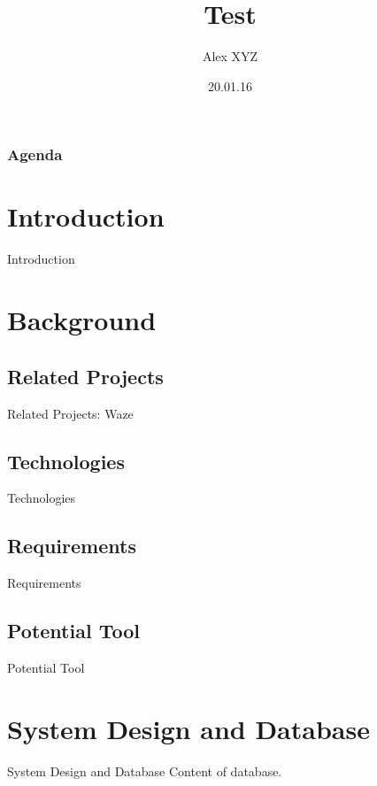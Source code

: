 \documentclass[xcolor=dvipsnames]{beamer}
\title{Test}
\author{Alex XYZ}
\institute{University XYZ}
\date{20.01.16}
\begin{document}
\beamertemplatenavigationsymbolsempty

\begin{frame}
\titlepage
\end{frame}

\begin{frame}
\frametitle{Agenda}
\tableofcontents[hidesubsections]
\end{frame}


\section{Introduction}
\begin{frame}{Introduction}
\end{frame}


\section{Background}

\subsection{Related Projects}
\begin{frame}{Related Projects: Waze}


\end{frame}

\subsection{Technologies}
\begin{frame}{Technologies}

\end{frame}


\subsection{Requirements}
\begin{frame}{Requirements}

\end{frame}

\subsection{Potential Tool}
\begin{frame}{Potential Tool}

\end{frame}

\section{System Design and Database}
\begin{frame}{System Design and Database}
Content of database.
\end{frame}
\end{document}
